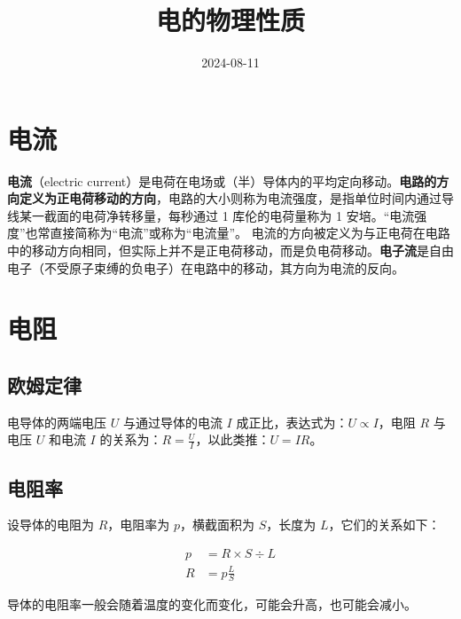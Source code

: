 

\usepackage{amsmath}
\usepackage{amssymb}
\usepackage{siunitx}

\title{电的物理性质}
\date{2024-08-11}


\maketitle\newpage
\tableofcontents\newpage

\section{电流}

\textbf{电流}（electric current）是电荷在电场或（半）导体内的平均定向移动。\textbf{电路的方向定义为正电荷移动的方向}，电路的大小则称为电流强度，是指单位时间内通过导线某一截面的电荷净转移量，每秒通过 1 库伦的电荷量称为 1 安培。“电流强度”也常直接简称为“电流”或称为“电流量”。
{\color{red}电流的方向被定义为与正电荷在电路中的移动方向相同，但实际上并不是正电荷移动，而是负电荷移动。}\textbf{电子流}是自由电子（不受原子束缚的负电子）在电路中的移动，其方向为电流的反向。

\section{电阻}

\subsection{欧姆定律}

电导体的两端电压 $U$ 与通过导体的电流 $I$ 成正比，表达式为：$U \propto I$，电阻 $R$ 与电压 $U$ 和电流 $I$ 的关系为：$R = \frac{U}{I}$，以此类推：$U = IR$。

\subsection{电阻率}

设导体的电阻为 $R$，电阻率为 $p$，横截面积为 $S$，长度为 $L$，它们的关系如下：

\begin{align*}
p &= R \times S \div L \\
R &= p\frac{L}{S}
\end{align*}

导体的电阻率一般会随着温度的变化而变化，可能会升高，也可能会减小。

